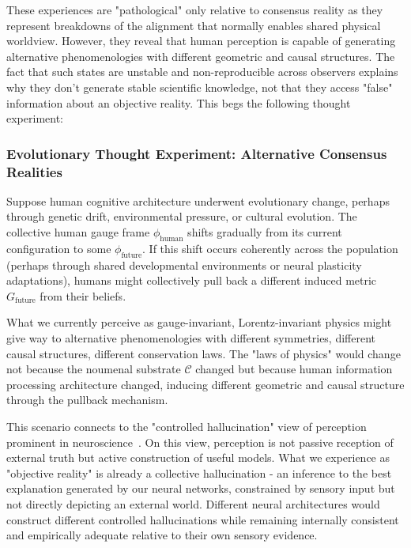 \documentclass[11pt]{article}
\begin{document}
These experiences are "pathological" only relative to consensus reality as they represent breakdowns of the alignment that normally enables shared physical worldview. However, they reveal that human perception is capable of generating alternative phenomenologies with different geometric and causal structures. The fact that such states are unstable and non-reproducible across observers explains why they don't generate stable scientific knowledge, not that they access "false" information about an objective reality.  This begs the following thought experiment:

\subsubsection{Evolutionary Thought Experiment: Alternative Consensus Realities}

Suppose human cognitive architecture underwent evolutionary change, perhaps through genetic drift, environmental pressure, or cultural evolution. The collective human gauge frame $\phi_{\text{human}}$ shifts gradually from its current configuration to some $\phi_{\text{future}}$. If this shift occurs coherently across the population (perhaps through shared developmental environments or neural plasticity adaptations), humans might collectively pull back a different induced metric $G_{\text{future}}$ from their beliefs.

What we currently perceive as gauge-invariant, Lorentz-invariant physics might give way to alternative phenomenologies with different symmetries, different causal structures, different conservation laws. The "laws of physics" would change not because the noumenal substrate $\mathcal{C}$ changed but because human information processing architecture changed, inducing different geometric and causal structure through the pullback mechanism.

This scenario connects to the "controlled hallucination" view of perception prominent in neuroscience~\cite{Clark2016,Hoffman2019}. On this view, perception is not passive reception of external truth but active construction of useful models. What we experience as "objective reality" is already a collective hallucination - an inference to the best explanation generated by our neural networks, constrained by sensory input but not directly depicting an external world. Different neural architectures would construct different controlled hallucinations while remaining internally consistent and empirically adequate relative to their own sensory evidence.
\end{document}
